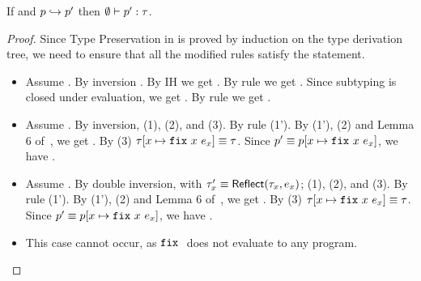 \begin{lemma}
If \hastype{\emptyset}{\prog}{\typ}
       and $\evals{\prog}{\prog'}$ then $\emptyset \vdash p' : \tau$.
\end{lemma}
\begin{proof}
Since Type Preservation in \undeclang is proved by induction on the type derivation tree, 
we need to ensure that all the modified rules satisfy the statement. 
\begin{itemize}
\item\rtexact
 Assume 
 	.
 By inversion
	.
 By IH we get 
	.
 By rule \rtexact we get 
 	.
 Since subtyping is closed under evaluation, we get 
 	                {}.
 By rule \rtsub we get 
 	.

\item\rtlet
  Assume 
	.
 By inversion, 
     (1), 
    (2), and
   \iswellformed{\env}{\typ} (3). 
 By rule \rtfix
     (1').
 By (1'), (2) and Lemma 6 of~\citep{Vazou14-tech}, we get 
   . 
 By (3)
   $ \SUBST{\gtyp}{x}{\efix{x}\ e_x} \equiv \gtyp$.    
 Since 
   $\prog' \equiv \SUBST{\prog}{x}{\efix{x}\ {e_x}}$, 
 we have 
 . 

\item\rtreflect
  Assume 
	.
 By double inversion, with $\tau_x' \equiv \mathsf{Reflect}(\tau_x, e_x) $; 
     (1), 
    (2), and
   \iswellformed{\env}{\typ} (3). 
 By rule \rtfix
     (1').
 By (1'), (2) and Lemma 6 of~\citep{Vazou14-tech}, we get 
   . 
 By (3)
   $ \SUBST{\gtyp}{x}{\efix{x}\ e_x} \equiv \gtyp$.    
 Since 
   $\prog' \equiv \SUBST{\prog}{x}{\efix{x}\ {e_x}}$, 
 we have 
 . 

\item\rtfix
  This case cannot occur, as $\mathtt{fix}\ {}$ does not evaluate to any program. 
\end{itemize}
\end{proof}
